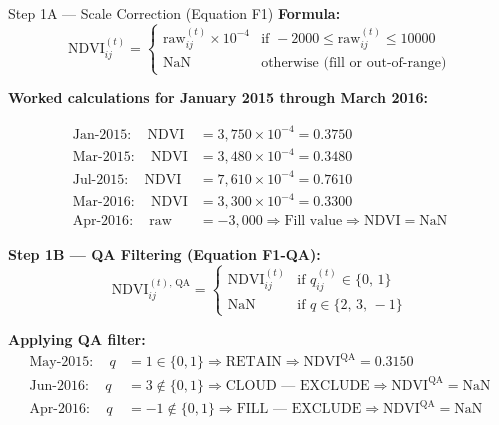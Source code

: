 \documentclass[12pt, a4paper]{article}
\begin{document}
\begin{stepbox}{Step 1A --- Scale Correction (Equation F1)}
\textbf{Formula:}
\begin{equation}
  \mathrm{NDVI}_{ij}^{(t)} =
  \begin{cases}
    \mathrm{raw}_{ij}^{(t)} \times 10^{-4} &
      \text{if } -2000 \le \mathrm{raw}_{ij}^{(t)} \le 10000 \\[4pt]
    \mathrm{NaN} & \text{otherwise (fill or out-of-range)}
  \end{cases}
  \tag{F1}
\end{equation}
\end{stepbox}

\textbf{Worked calculations for January 2015 through March 2016:}

\begin{align}
\text{Jan-2015}: \quad
\mathrm{NDVI} &= 3{,}750 \times 10^{-4} = \mathbf{0.3750}
\label{eq:sc_jan15}\\[3pt]
\text{Mar-2015}: \quad
\mathrm{NDVI} &= 3{,}480 \times 10^{-4} = \mathbf{0.3480}
\label{eq:sc_mar15}\\[3pt]
\text{Jul-2015}: \quad
\mathrm{NDVI} &= 7{,}610 \times 10^{-4} = \mathbf{0.7610}
\label{eq:sc_jul15}\\[3pt]
\text{Mar-2016}: \quad
\mathrm{NDVI} &= 3{,}300 \times 10^{-4} = \mathbf{0.3300}
\label{eq:sc_mar16}\\[3pt]
\text{Apr-2016}: \quad
\mathrm{raw} &= -3{,}000 \Rightarrow
\text{Fill value} \Rightarrow \mathrm{NDVI} = \mathbf{\mathrm{NaN}}
\label{eq:sc_apr16}
\end{align}

\medskip
\textbf{Step 1B --- QA Filtering (Equation F1-QA):}
\begin{equation}
  \mathrm{NDVI}_{ij}^{(t),\,\mathrm{QA}} =
  \begin{cases}
    \mathrm{NDVI}_{ij}^{(t)} & \text{if } q_{ij}^{(t)} \in \{0,\,1\} \\[4pt]
    \mathrm{NaN}             & \text{if } q \in \{2,\,3,\,-1\}
  \end{cases}
  \tag{F1-QA}
\end{equation}

\textbf{Applying QA filter:}
\begin{align}
\text{May-2015}: \quad q &= 1 \in \{0,1\}
  \Rightarrow \text{RETAIN} \Rightarrow
  \mathrm{NDVI}^{\mathrm{QA}} = 0.3150
  \label{eq:qa_may15}\\[3pt]
\text{Jun-2016}: \quad q &= 3 \notin \{0,1\}
  \Rightarrow \text{CLOUD --- EXCLUDE} \Rightarrow
  \mathrm{NDVI}^{\mathrm{QA}} = \mathbf{\mathrm{NaN}}
  \label{eq:qa_jun16}\\[3pt]
\text{Apr-2016}: \quad q &= -1 \notin \{0,1\}
  \Rightarrow \text{FILL --- EXCLUDE} \Rightarrow
  \mathrm{NDVI}^{\mathrm{QA}} = \mathbf{\mathrm{NaN}}
  \label{eq:qa_apr16}
\end{align}
\end{document}

